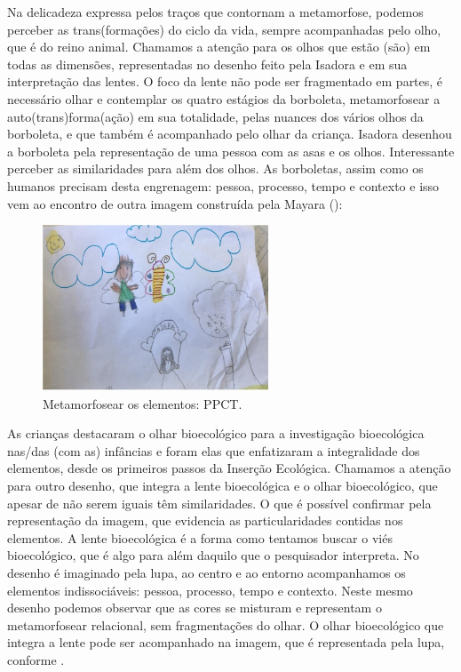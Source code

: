 \documentclass{textolivre}
\begin{document}
Na delicadeza expressa pelos traços que contornam a metamorfose, podemos perceber as trans(formações) do ciclo da vida, sempre acompanhadas pelo olho, que é do reino animal. Chamamos a atenção para os olhos que estão (são) em todas as dimensões, representadas no desenho feito pela Isadora e em sua interpretação das lentes. O foco da lente não pode ser fragmentado em partes, é necessário olhar e contemplar os quatro estágios da borboleta, metamorfosear a auto(trans)forma(ação) em sua totalidade, pelas nuances dos vários olhos da borboleta, e que também é acompanhado pelo olhar da criança. Isadora desenhou a borboleta pela representação de uma pessoa com as asas e os olhos. Interessante perceber as similaridades para além dos olhos. As borboletas, assim como os humanos precisam desta engrenagem: pessoa, processo, tempo e contexto e isso vem ao encontro de outra imagem construída pela Mayara (): 

\begin{figure}[h!]
 \centering
 \includegraphics[width=0.6\textwidth]{figure04.png}
 \caption{Metamorfosear os elementos: PPCT.}
 \label{fig-fig04}
\end{figure}

As crianças destacaram o olhar bioecológico para a investigação bioecológica nas/das (com as) infâncias e foram elas que enfatizaram a integralidade dos elementos, desde os primeiros passos da Inserção Ecológica. Chamamos a atenção para outro desenho, que integra a lente bioecológica e o olhar bioecológico, que apesar de não serem iguais têm similaridades. O que é possível confirmar pela representação da imagem, que evidencia as particularidades contidas nos elementos. A lente bioecológica é a forma como tentamos buscar o viés bioecológico, que é algo para além daquilo que o pesquisador interpreta. No desenho é imaginado pela lupa, ao centro e ao entorno acompanhamos os elementos indissociáveis: pessoa, processo, tempo e contexto. Neste mesmo desenho podemos observar que as cores se misturam e representam o metamorfosear relacional, sem fragmentações do olhar. O olhar bioecológico que integra a lente pode ser acompanhado na imagem, que é representada pela lupa, conforme . 
\end{document}
